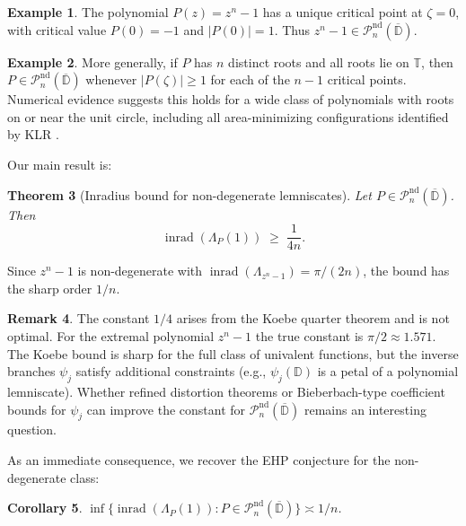 \documentclass[11pt,a4paper]{amsart}
\newtheorem{theorem}{Theorem}[section]
\newtheorem{corollary}[theorem]{Corollary}
\theoremstyle{definition}
\newtheorem{example}[theorem]{Example}
\newtheorem{remark}[theorem]{Remark}
\newcommand{\D}{\mathbb{D}}
\newcommand{\T}{\mathbb{T}}
\newcommand{\Pn}{\mathcal{P}_n}
\newcommand{\abs}[1]{\lvert #1 \rvert}
\newcommand{\inrad}{\operatorname{inrad}}
\begin{document}
\begin{example}\label{ex:roots-of-unity}
The polynomial $P(z) = z^n - 1$ has a unique critical point at $\zeta = 0$,
with critical value $P(0) = -1$ and $\abs{P(0)} = 1$.  Thus
$z^n - 1 \in \Pn^{\mathrm{nd}}(\overline{\D})$.
\end{example}

\begin{example}\label{ex:simple-roots}
More generally, if $P$ has $n$ distinct roots and all roots lie on $\T$,
then $P \in \Pn^{\mathrm{nd}}(\overline{\D})$ whenever
$\abs{P(\zeta)} \geq 1$ for each of the $n-1$ critical points.
Numerical evidence suggests this holds for a wide class of polynomials
with roots on or near the unit circle, including all area-minimizing
configurations identified by KLR \cite{KLR25}.
\end{example}

Our main result is:

\begin{theorem}[Inradius bound for non-degenerate lemniscates]
\label{thm:main}
Let $P \in \Pn^{\mathrm{nd}}(\overline{\D})$.  Then
\[
  \inrad(\Lambda_P(1)) \;\geq\; \frac{1}{4n}.
\]
\end{theorem}

Since $z^n - 1$ is non-degenerate with $\inrad(\Lambda_{z^n-1}) = \pi/(2n)$,
the bound has the sharp order $1/n$.

\begin{remark}
The constant $1/4$ arises from the Koebe quarter theorem and is not optimal.
For the extremal polynomial $z^n - 1$ the true constant is $\pi/2 \approx 1.571$.
The Koebe bound is sharp for the full class of univalent functions, but
the inverse branches $\psi_j$ satisfy additional constraints
(e.g., $\psi_j(\D)$ is a petal of a polynomial lemniscate).
Whether refined distortion theorems or Bieberbach-type
coefficient bounds for $\psi_j$ can improve the constant for
$\Pn^{\mathrm{nd}}(\overline{\D})$ remains an interesting question.
\end{remark}

As an immediate consequence, we recover the EHP conjecture for the
non-degenerate class:

\begin{corollary}\label{cor:nd-class}
$\inf\bigl\{\inrad(\Lambda_P(1)) : P \in \Pn^{\mathrm{nd}}(\overline{\D})\bigr\}
\asymp 1/n$.
\end{corollary}

\end{document}
